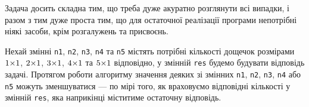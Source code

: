 \Tutorial	Задача досить складна тим, що треба дуже акуратно розглянути всі випадки, і разом з тим дуже проста тим, що для остаточної реалізації програми не\nolinebreak[3] потрібні ніякі засоби, крім розгалужень та присвоєнь. 

Нехай змінні \texttt{n1}, \texttt{n2}, \texttt{n3}, \texttt{n4} та \texttt{n5} містять потрібні кількості дощечок розмірами $1{\times}1$, $2{\times}1$, $3{\times}1$, $4{\times}1$ та $5{\times}1$ відповідно, у змінній \texttt{res} будемо будувати відповідь задачі. Протягом роботи алгоритму значення деяких зі змінних \texttt{n1}, \texttt{n2}, \texttt{n3}, \texttt{n4} або \texttt{n5} можуть зменшуватися — по мірі того, як враховуємо відповідні кількості у змінній \texttt{res}, яка наприкінці міститиме остаточну відповідь. 






